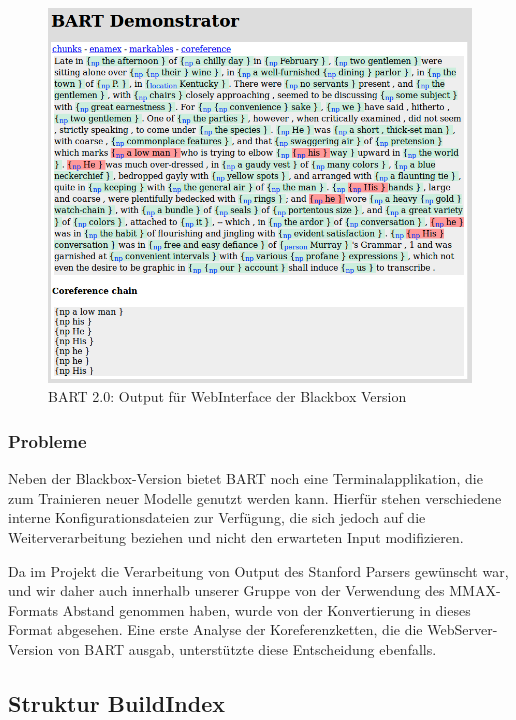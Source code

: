 \begin{figure}[ht]
\begin{center}
\includegraphics[width=12cm]{./img/cle/bart_webUI_output.png}
\caption{BART 2.0: Output für WebInterface der Blackbox Version}
\label{bart_webUI_output}
\end{center}
\end{figure}

\subsubsection{Probleme}

\noindent
Neben der Blackbox-Version bietet BART noch eine Terminalapplikation, 
die zum Trainieren neuer Modelle genutzt werden kann.
Hierfür stehen verschiedene interne Konfigurationsdateien zur Verfügung,
die sich jedoch auf die Weiterverarbeitung beziehen und nicht den erwarteten
Input modifizieren.

Da im Projekt die Verarbeitung von Output des Stanford Parsers gewünscht war,
und wir daher auch innerhalb unserer Gruppe von der Verwendung des MMAX-Formats 
Abstand genommen haben, wurde von der Konvertierung in dieses Format abgesehen.
Eine erste Analyse der Koreferenzketten, die die WebServer-Version von BART ausgab,
unterstützte diese Entscheidung ebenfalls.

\subsection{Struktur BuildIndex} %
 
